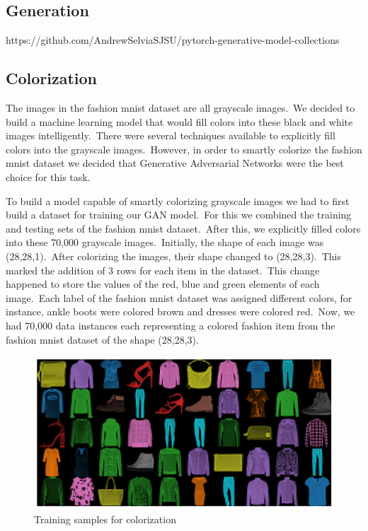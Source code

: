 \documentclass[conference]{IEEEtran}
\begin{document}
    \begin{figure}
        \caption{}
        \label{fig:classification-2}
    \end{figure}

    \subsection{Generation}\label{subsec:implementation-generation}

    https://github.com/AndrewSelviaSJSU/pytorch-generative-model-collections

    \subsection{Colorization}\label{subsec:implementation-colorization}

    The images in the fashion mnist dataset are all grayscale images.\ We decided to build a machine learning model that would fill colors into these black and white images intelligently.\ There were several techniques available to explicitly fill colors into the grayscale images.\ However, in order to smartly colorize the fashion mnist dataset we decided that Generative Adversarial Networks were the best choice for this task.

    To build a model capable of smartly colorizing grayscale images we had to first build a dataset for training our GAN model.\ For this we combined the training and testing sets of the fashion mnist dataset.\ After this, we explicitly filled colors into these 70,000 grayscale images.\ Initially, the shape of each image was (28,28,1).\ After colorizing the images, their shape changed to (28,28,3).\ This marked the addition of 3 rows for each item in the dataset.\ This change happened to store the values of the red, blue and green elements of each image.\ Each label of the fashion mnist dataset was assigned different colors, for instance, ankle boots were colored brown and dresses were colored red.\ Now, we had 70,000 data instances each representing a colored fashion item from the fashion mnist dataset of the shape (28,28,3).

    \begin{figure}
        \caption{Training samples for colorization}
        \label{fig:colorization}
        \centering
        \includegraphics[scale = 0.33]{Colorization_training_samples.png}
    \end{figure}
\end{document}
